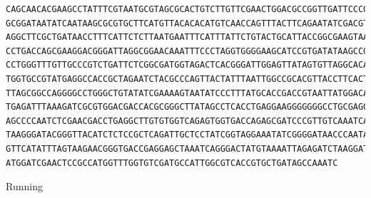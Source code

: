 \documentclass[a4paper,9pt]{extarticle}
\begin{document}
\begin{verbatim}
CAGCAACACGAAGCCTATTTCGTAATGCGTAGCGCACTGTCTTGTTCGAACTGGACGCCGGTTGATTCCCGCCAGCCGTGGGGTT
GCGGATAATATCAATAAGCGCGTGCTTCATGTTACACACATGTCAACCAGTTTACTTCAGAATATCGACGTCTTGTTGGACCTTA
AGGCTTCGCTGATAACCTTTCATTCTCTTAATGAATTTCATTTATTCTGTACTGCATTACCGGCGAAGTAATCCGCTAGACCGGG
CCTGACCAGCGAAGGACGGGATTAGGCGGAACAAATTTCCCTAGGTGGGGAAGCATCCGTGATATAAGCCGCGTAGCTCTCGCTC
CCTGGGTTTGTTGCCCGTCTGATTCTCGGCGATGGTAGACTCACGGGATTGGAGTTATAGTGTTAGGCACAGGGAGGATGGACAT
TGGTGCCGTATGAGGCCACCGCTAGAATCTACGCCCAGTTACTATTTAATTGGCCGCACGTTACCTTCACTAGGATCCCGGTCTT
TTAGCGGCCAGGGGCCTGGGCTGTATATCGAAAAGTAATATCCCTTTATGCACCGACCGTAATTATGGACAGCACATATACATTA
TGAGATTTAAAGATCGCGTGGACGACCACGCGGGCTTATAGCCTCACCTGAGGAAGGGGGGGCCTGCGAGGGAGCTTGAACCTGT
AGCCCCAATCTCGAACGACCTGAGGCTTGTGTGGTCAGAGTGGTGACCAGAGCGATCCCGTTGTCAAATCAACCTAGAGGAGAGG
TAAGGGATACGGGTTACATCTCTCCGCTCAGATTGCTCCTATCGGTAGGAAATATCGGGGATAACCCAATACAAAACGCTGAACT
GTTCATATTTAGTAAGAACGGGTGACCGAGGAGCTAAATCAGGGACTATGTAAAATTAGAGATCTAAGGATAGTAGCACCCGCGC
ATGGATCGAACTCCGCCATGGTTTGGTGTCGATGCCATTGGCGTCACCGTGCTGATAGCCAAATC
\end{verbatim}
Running
{}

\clearpage
{}    %
\small
{}


\end{document}
